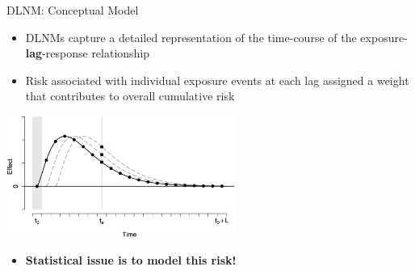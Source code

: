 \documentclass[english]{beamer}
\newcommand{\alertblue}[1]{{\color{blue}#1}}
\begin{document}
\begin{frame}{DLNM: Conceptual Model}
    \begin{itemize}
        \item DLNMs capture a detailed representation of the \alertblue{time-course} of the \alertblue{exposure-\textbf{lag}-response relationship} 
         \item Risk associated with individual exposure events at each lag \alertblue{assigned a weight} that contributes to \alertblue{overall cumulative risk}
  \end{itemize}  
    \centering
    \includegraphics[width=7.5cm,keepaspectratio]{images/delayed effect.png}
  \begin{itemize}
      \item \textbf{\alertblue{Statistical issue is to model this risk!}}
  \end{itemize} 
\end{frame}
\end{document}
